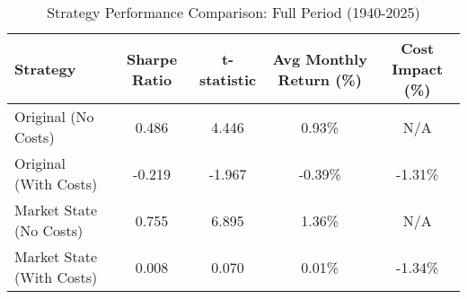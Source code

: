 \begin{table}[htbp]
\caption{Strategy Performance Comparison: Full Period (1940-2025)}
\label{tab:strategy_comparison_full}
\begin{tabular}{l|cccc}
\hline
Strategy & Sharpe Ratio & t-statistic & Avg Monthly Return (\%) & Cost Impact (\%) \\
\hline
Original (No Costs) & 0.486 & 4.446 & 0.93\% & N/A \\
Original (With Costs) & -0.219 & -1.967 & -0.39\% & -1.31\% \\
Market State (No Costs) & 0.755 & 6.895 & 1.36\% & N/A \\
Market State (With Costs) & 0.008 & 0.070 & 0.01\% & -1.34\% \\
\hline
\end{tabular}
\end{table}
